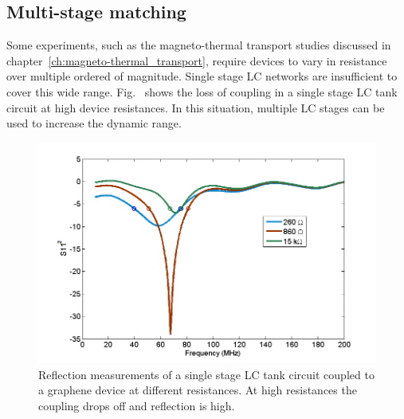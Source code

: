 \subsection{Multi-stage matching}
Some experiments, such as the magneto-thermal transport studies discussed in chapter~\ref{ch:magneto-thermal_transport}, require devices to vary in resistance over multiple ordered of magnitude. Single stage LC networks are insufficient to cover this wide range. Fig.~\cite{fig:S11_3Rs} shows the loss of coupling in a single stage LC tank circuit at high device resistances. In this situation, multiple LC stages can be used to increase the dynamic range.
\begin{figure}
\centering
\includegraphics[width = 120mm]{figures/Johnson_noise_thermometry/S11_3Rs.png}
\caption{Reflection measurements of a single stage LC tank circuit coupled to a graphene device at different resistances. At high resistances the coupling drops off and reflection is high.}
\label{fig:S11_3Rs}
\end{figure}

